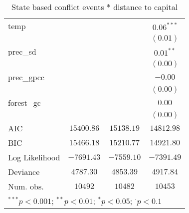 \begin{sidewaystable}
\begin{center}
{\begin{tabular}{l c c c}
temp                 &               &                & $0.06^{***}$    \\
                     &               &                & $(0.01)$        \\
prec\_sd             &               &                & $0.01^{**}$     \\
                     &               &                & $(0.00)$        \\
prec\_gpcc           &               &                & $-0.00$         \\
                     &               &                & $(0.00)$        \\
forest\_gc           &               &                & $0.00$          \\
                     &               &                & $(0.00)$        \\
\hline
AIC                  & $15400.86$    & $15138.19$     & $14812.98$      \\
BIC                  & $15466.18$    & $15210.77$     & $14921.80$      \\
Log Likelihood       & $-7691.43$    & $-7559.10$     & $-7391.49$      \\
Deviance             & $4787.30$     & $4853.39$      & $4917.84$       \\
Num. obs.            & $10492$       & $10482$        & $10453$         \\
\hline
\multicolumn{4}{l}{\scriptsize{$^{***}p<0.001$; $^{**}p<0.01$; $^{*}p<0.05$; $^{\cdot}p<0.1$}}
\end{tabular}
}
\caption{State based conflict events *
		  distance to capital}
\label{interaction_sqrtState_based}
\end{center}
\end{sidewaystable}
